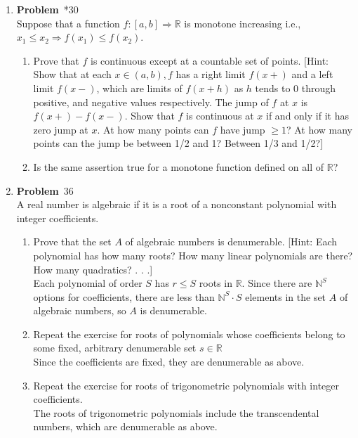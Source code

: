 \documentclass[12pt]{amsart}
\newcommand{\benu}{\begin{enumerate}}
\newcommand{\eenu}{\end{enumerate}}
\theoremstyle{definition}
\newcommand{\mbR}{\mathbb{R}}
\newcommand{\mbN}{\mathbb{N}}
\newcommand{\itep}{\item {\bfseries Problem}\ }
\begin{document}
\begin{enumerate}[series=p]
\newpage
\itep *30\\
Suppose that a function $f : [a,b] \Rightarrow \mbR$ is monotone increasing i.e., $x_1 \leq x_2 \Rightarrow f(x_1) \leq f(x_2).$
\benu
\item Prove that $f$ is continuous except at a countable set of points.  [Hint: Show that at each $x \in (a,b), f$ has a right limit $f(x+)$ and a left limit $f(x-)$, which are limits of $f(x+h)$ as $h$ tends to 0 through positive, and negative values respectively.  The jump of $f$ at $x$ is $f(x+) - f(x-)$.  Show that $f$ is continuous at $x$ if and only if it has zero jump at $x$.  At how many points can $f$ have jump $\geq 1$?  At how many points can the jump be between 1/2 and 1?  Between 1/3 and 1/2?]
\\
\item Is the same assertion true for a monotone function defined on all of $\mbR$?
\\
\eenu

\newpage
\itep 36\\
A real number is algebraic if it is a root of a nonconstant polynomial with integer coefficients.
\benu
\item Prove that the set $A$ of algebraic numbers is denumerable.  [Hint: Each polynomial has how many roots?  How many linear polynomials are there?  How many quadratics? . . .]
\\
Each polynomial of order $S$ has $r \leq S$ roots in $\mbR$.  Since there are $\mbN^S$ options for coefficients, there are less than $\mbN^S \cdot S$ elements in the set $A$ of algebraic numbers, so $A$ is denumerable.
\\
\item Repeat the exercise for roots of polynomials whose coefficients belong to some fixed, arbitrary denumerable set $s \in \mbR$
\\
Since the coefficients are fixed, they are denumerable as above.
\\
\item Repeat the exercise for roots of trigonometric polynomials with integer coefficients.
\\
The roots of trigonometric polynomials include the transcendental numbers, which are denumerable as above.
\eenu

\end{enumerate}
\end{document}

